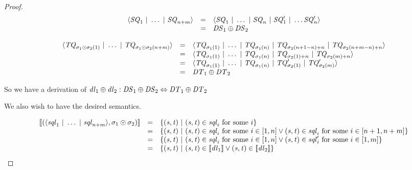 \documentclass[acmsmall]{acmart}
\begin{document}
\begin{proof}
  \[
    \begin{array}{rcl}
      \langle\mathit{SQ}_1 ~|~ \ldots ~|~ \mathit{SQ}_{n+m}\rangle
      & = & \langle\mathit{SQ}_1 ~|~ \ldots ~|~ \mathit{SQ}_n ~|~ 
            \mathit{SQ}_1' ~|~ \ldots\mathit{SQ}_n'\rangle\\
      & = & \mathit{DS}_1\oplus\mathit{DS}_2
    \end{array}
  \]


  \[
    \begin{array}{rcl}
      \langle\mathit{TQ}_{\sigma_1\odot\sigma_2(1)} ~|~ \ldots ~|~ 
      \mathit{TQ}_{\sigma_1\odot\sigma_2(n+m)}\rangle
      & = & \langle\mathit{TQ}_{\sigma_1(1)} ~|~ \ldots ~|~ \mathit{TQ}_{\sigma_1(n)} ~|~ 
            \mathit{TQ}_{\sigma_2(n+1-n)+n} ~|~ \mathit{TQ}_{\sigma_2(n+m-n)+n}\rangle\\
      & = & \langle\mathit{TQ}_{\sigma_1(1)} ~|~ \ldots ~|~ \mathit{TQ}_{\sigma_1(n)} ~|~ 
            \mathit{TQ}_{\sigma_2(1)+n} ~|~ \mathit{TQ}_{\sigma_2(m)+n}\rangle\\
      & = & \langle\mathit{TQ}_{\sigma_1(1)} ~|~ \ldots ~|~ \mathit{TQ}_{\sigma_1(n)} ~|~ 
            \mathit{TQ}_{\sigma_2(1)}' ~|~ \mathit{TQ}_{\sigma_2(m)}'\rangle\\
      & = & \mathit{DT}_1\oplus\mathit{DT}_2
    \end{array}
  \]

  So we have a derivation of $\mathit{dl}_1\oplus\mathit{dl}_2 :
  \mathit{DS}_1\oplus\mathit{DS}_2 \Leftrightarrow
  \mathit{DT}_1\oplus\mathit{DT}_2$

  We also wish to have the desired semantics.

  \[
    \begin{array}{rcl}
      [ \! [(\langle\mathit{sql}_1 ~|~ \ldots ~|~ \mathit{sql}_{n+m}\rangle,
      \sigma_1\odot\sigma_2)] \! ]
      & = & \{(\mathit{s},\mathit{t})~|~
            (\mathit{s},\mathit{t})\in\mathit{sql}_i\text{ for some $i$}\}\\
      & = & \{(\mathit{s},\mathit{t})~|~
            (\mathit{s},\mathit{t})\in\mathit{sql}_i
            \text{ for some $i\in[1,n]$} \vee
            (\mathit{s},\mathit{t})\in\mathit{sql}_i
            \text{ for some $i\in[n+1,n+m]$}\}\\
      & = & \{(\mathit{s},\mathit{t})~|~
            (\mathit{s},\mathit{t})\in\mathit{sql}_i
            \text{ for some $i\in[1,n]$} \vee
            (\mathit{s},\mathit{t})\in\mathit{sql}_i'
            \text{ for some $i\in[1,m]$}\}\\
      & = & \{(\mathit{s},\mathit{t}) ~|~
            (\mathit{s},\mathit{t})\in[ \! [\mathit{dl}_1] \! ]
            \vee(\mathit{s},\mathit{t})\in[ \! [\mathit{dl}_2] \! ]\}
    \end{array}
  \]

\end{proof}
\end{document}
